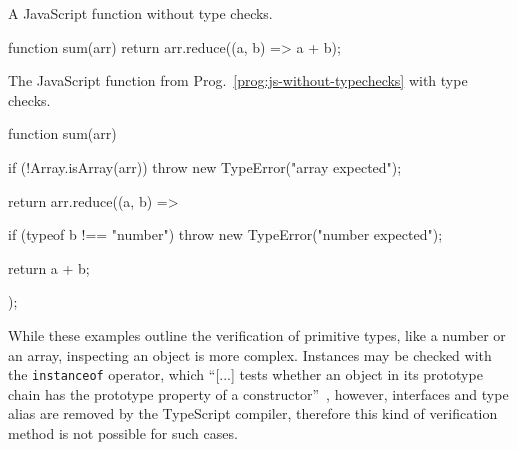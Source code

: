 \begin{program}[h]
\caption{A JavaScript function without type checks.}
\label{prog:js-without-typechecks}
\begin{JsCode}
function sum(arr) {
  return arr.reduce((a, b) =>  a + b);
}
\end{JsCode}
\end{program}
\begin{program}
\caption{The JavaScript function from Prog.~\ref{prog:js-without-typechecks} with type checks.}
\label{prog:js-with-typechecks}
\begin{JsCode}
function sum(arr) {
  if (!Array.isArray(arr)) {
    throw new TypeError("array expected");
  }
  
  return arr.reduce((a, b) => {
    if (typeof b !== "number") {
      throw new TypeError("number expected");
    }
    
    return a + b;
  });
}
\end{JsCode}
\end{program}

\noindent
While these examples outline the verification of primitive types, like a number or an array, inspecting an object is more complex. Instances may be checked with the \texttt{instanceof} operator, which ``[...] tests whether an object in its prototype chain has the prototype property of a constructor''~\cite{instanceof:MDN:2017}, however, interfaces and type alias are removed by the TypeScript compiler, therefore this kind of verification method is not possible for such cases.

